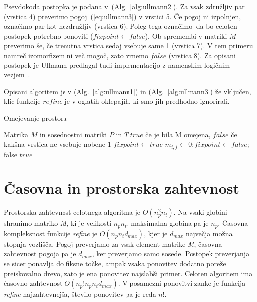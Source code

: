 \documentclass[a4paper, 12pt, ]{book}
\newcommand{\refalg}[1]{(Alg.~\ref{#1})}
\begin{document}
	Psevdokoda postopka je podana v~\refalg{alg:ullmann2}. Za vsak
	združljiv par (vrstica 4) preverimo pogoj~(\ref{eq:ullmann3}) v vrstici 5. Če pogoj ni izpolnjen, označimo par kot nezdružljiv (vrstica 6). Poleg tega
	označimo, da bo celoten postopek potrebno ponoviti ($fixpoint \gets false$). Ob spremembi v matriki $M$ preverimo še, če trenutna vrstica sedaj vsebuje
	same 1 (vrstica 7). V tem primeru namreč izomorfizem ni več mogoč, zato vrnemo $false$ (vrstica 8). Za opisani postopek je Ullmann predlagal tudi
	implementacijo z namenskim logičnim vezjem~\cite{ullmann}.

	Opisani algoritem je v \refalg{alg:ullmann1} in \refalg{alg:ullmann3} že vključen, klic funkcije $refine$ je v oglatih oklepajih, ki smo jih predhodno
	ignorirali.

\begin{algorithm}
\caption{Omejevanje prostora}
\label{alg:ullmann2}
\begin{algorithmic}[1]
	\Require Matrika $M$ in sosednostni matriki $P$ in $T$
	\Ensure $true$ če je bila M omejena, $false$ če kakšna vrstica ne vsebuje nobene 1
		\Repeat
			\State $fixpoint \gets true$
					\State $m_{i,j} \gets 0; fixpoint \gets false;$
						\State \Return false
					\EndIf
				\EndIf
			\EndFor
		\State \Return $true$
	\EndProcedure
\end{algorithmic}
\end{algorithm}

	\section {Časovna in prostorska zahtevnost}
	Prostorska zahtevnost celotnega algoritma je $O(n_p^2 n_t)$. Na vsaki globini shranimo matriko $M$, ki je velikosti $n_p n_t$, maksimalna 
	globina pa 
	je $n_p$. Časovna kom\-pleksnost funkcije \textit{refine} je $O(n_p n_t d_{max})$, kjer je $d_{max}$ največja možna stopnja vozlišča. Pogoj 
	preverjamo za
	vsak	element matrike $M$, časovna zahtevnost pogoja pa je $d_{max}$, ker preverjamo samo sosede. Postopek preverjanja se sicer ponavlja do fiksne
	točke, ampak vsaka ponovitev dodatno poreže preiskovalno drevo, zato je ena ponovitev najslabši primer. Celoten algoritem ima časovno zahtevnost
	$O(n_p! n_p n_t d_{max})$. V posamezni ponovitvi zanke je funkcija \textit{refine} najzahtevnejša, število ponovitev pa je reda $n!$.
\end{document}
